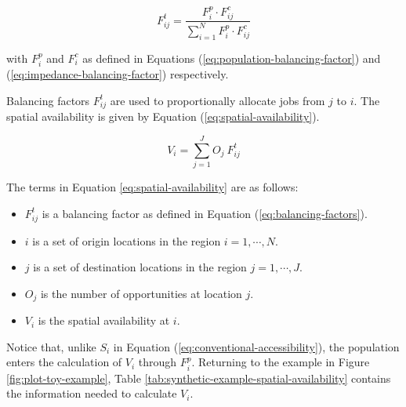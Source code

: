 \documentclass[]{elsarticle} %
\providecommand{\tightlist}{%
  \setlength{\itemsep}{0pt}\setlength{\parskip}{0pt}}
\begin{document}
\begin{equation}
\label{eq:balancing-factors}
F^t_{ij} = \frac{F^p_{i} \cdot F^c_{ij}}{\sum_{i=1}^N F^p_{i} \cdot F^c_{ij}}
\end{equation}

\noindent with \(F^p_{i}\) and \(F^c_{i}\) as defined in Equations
(\ref{eq:population-balancing-factor}) and
(\ref{eq:impedance-balancing-factor}) respectively.

Balancing factors \(F^t_{ij}\) are used to proportionally allocate jobs
from \(j\) to \(i\). The spatial availability is given by Equation
(\ref{eq:spatial-availability}).

\begin{equation}
\label{eq:spatial-availability}
V_{i} = \sum_{j=1}^J O_j\ F^t_{ij}
\end{equation}

The terms in Equation \ref{eq:spatial-availability} are as follows:

\begin{itemize}
\tightlist
\item
  \(F^t_{ij}\) is a balancing factor as defined in Equation
  (\ref{eq:balancing-factors}).
\item
  \(i\) is a set of origin locations in the region \(i = 1,\cdots, N\).
\item
  \(j\) is a set of destination locations in the region
  \(j = 1,\cdots,J\).
\item
  \(O_j\) is the number of opportunities at location \(j\).
\item
  \(V_{i}\) is the spatial availability at \(i\).
\end{itemize}

Notice that, unlike \(S_i\) in Equation
(\ref{eq:conventional-accessibility}), the population enters the
calculation of \(V_{i}\) through \(F^p_i\). Returning to the example in
Figure \ref{fig:plot-toy-example}, Table
\ref{tab:synthetic-example-spatial-availability} contains the
information needed to calculate \(V_i\).

 
  \providecommand{\huxb}[2]{\arrayrulecolor[RGB]{#1}\global\arrayrulewidth=#2pt}
  \providecommand{\huxvb}[2]{\color[RGB]{#1}\vrule width #2pt}
  \providecommand{\huxtpad}[1]{\rule{0pt}{#1}}
  \providecommand{\huxbpad}[1]{\rule[-#1]{0pt}{#1}}
\end{document}
